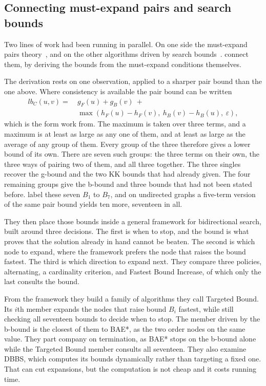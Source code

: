 \documentclass[letterpaper]{article} %
\begin{document}
\subsection{Connecting must-expand pairs and search bounds}
Two lines of work had been running in parallel. On one side the must-expand pairs theory~\cite{eckerle2017sufficient, shaham2017minimal, shaham2018consistent}, and on the other algorithms driven by search bounds~\cite{kaindl1997reconsidered, alcazar2020unifying}. \citet{siag2023frontToEnd} connect them, by deriving the bounds from the must-expand conditions themselves.

The derivation rests on one observation, applied to a sharper pair bound than the one above. Where consistency is available the pair bound can be written
\begin{align*} lb_C(u,v)=\ &g_F(u)+g_B(v)\ +\\ &\max\left(h_F(u)-h_F(v),\ h_B(v)-h_B(u),\ \varepsilon\right),
\end{align*} which is the form \citet{siag2023frontToEnd} work from. The maximum is taken over three terms, and a maximum is at least as large as any one of them, and at least as large as the average of any group of them. Every group of the three therefore gives a lower bound of its own. There are seven such groups: the three terms on their own, the three ways of pairing two of them, and all three together. The three singles recover the g-bound and the two KK bounds that \citet{alcazar2020unifying} had already given. The four remaining groups give the b-bound and three bounds that had not been stated before. \citet{siag2023frontToEnd} label these seven $B_1$ to $B_7$, and on undirected graphs a five-term version of the same pair bound yields ten more, seventeen in all.

They then place those bounds inside a general framework for bidirectional search, built around three decisions. The first is when to stop, and the bound is what proves that the solution already in hand cannot be beaten. The second is which node to expand, where the framework prefers the node that raises the bound fastest. The third is which direction to expand next. They compare three policies, alternating, a cardinality criterion, and Fastest Bound Increase, of which only the last consults the bound.

From the framework they build a family of algorithms they call Targeted Bound. Its $i$th member expands the nodes that raise bound $B_i$ fastest, while still checking all seventeen bounds to decide when to stop. The member driven by the b-bound is the closest of them to BAE*, as the two order nodes on the same value. They part company on termination, as BAE* stops on the b-bound alone while the Targeted Bound member consults all seventeen. They also examine DBBS, which computes its bounds dynamically rather than targeting a fixed one. That can cut expansions, but the computation is not cheap and it costs running time.
\end{document}
